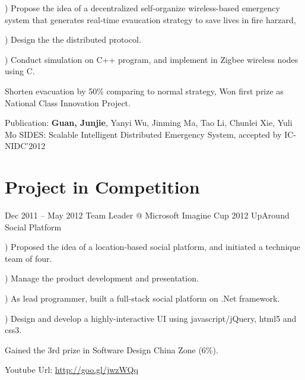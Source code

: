 \documentclass{tccv}
\begin{document}
\begin{eventlist}
     ) Propose the idea of a decentralized self-organize wireless-based emergency system that generates real-time evaucation strategy to save lives in fire harzard, 
     
     ) Design the the distributed protocol.
     
     ) Conduct simulation on C++ program, and implement in Zigbee wireless nodes using C.
     
Shorten evacuation by 50\% comparing to normal strategy, Won first prize as National Class Innovation Project.

Publication: \textbf{Guan, Junjie}, Yanyi Wu, Jinming Ma, Tao Li, Chunlei Xie, Yuli Mo SIDES: Scalable Intelligent Distributed Emergency System, accepted by IC-NIDC’2012
     
\end{eventlist}




















\clearpage
\section{Project in Competition}
\begin{eventlist}

\item{Dec 2011 -- May 2012}
     {Team Leader @ Microsoft Imagine Cup 2012}
     {UpAround Social Platform}
     
     ) Proposed the idea of a location-based social platform, and initiated a technique team of four.
     
     ) Manage the product development and presentation.
     
     ) As lead programmer, built a full-stack social platform on .Net framework. 
     
     ) Design and develop a highly-interactive UI using javascript/jQuery, html5 and css3.
     
Gained the 3rd prize in Software Design China Zone (6\%).   

Youtube Url: \underline{http://goo.gl/jwzWQq}
       
\end{eventlist}
\end{document}
